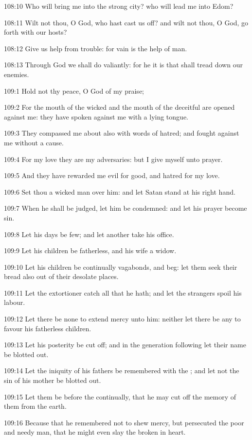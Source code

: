 108:10 Who will bring me into the strong city? who will lead me into
Edom?

108:11 Wilt not thou, O God, who hast cast us off? and wilt not thou,
O God, go forth with our hosts?

108:12 Give us help from trouble: for vain is the help of man.

108:13 Through God we shall do valiantly: for he it is that shall
tread down our enemies.



109:1 Hold not thy peace, O God of my praise;

109:2 For the mouth of the wicked and the mouth of the deceitful are
opened against me: they have spoken against me with a lying tongue.

109:3 They compassed me about also with words of hatred; and fought
against me without a cause.

109:4 For my love they are my adversaries: but I give myself unto
prayer.

109:5 And they have rewarded me evil for good, and hatred for my love.

109:6 Set thou a wicked man over him: and let Satan stand at his right
hand.

109:7 When he shall be judged, let him be condemned: and let his
prayer become sin.

109:8 Let his days be few; and let another take his office.

109:9 Let his children be fatherless, and his wife a widow.

109:10 Let his children be continually vagabonds, and beg: let them
seek their bread also out of their desolate places.

109:11 Let the extortioner catch all that he hath; and let the
strangers spoil his labour.

109:12 Let there be none to extend mercy unto him: neither let there
be any to favour his fatherless children.

109:13 Let his posterity be cut off; and in the generation following
let their name be blotted out.

109:14 Let the iniquity of his fathers be remembered with the \LORD;
and let not the sin of his mother be blotted out.

109:15 Let them be before the \LORD continually, that he may cut off
the memory of them from the earth.

109:16 Because that he remembered not to shew mercy, but persecuted
the poor and needy man, that he might even slay the broken in heart.

